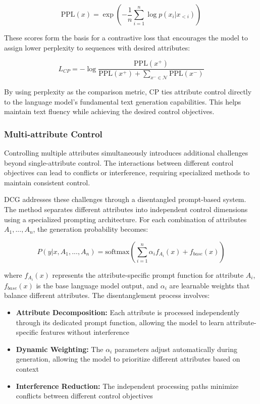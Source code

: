\begin{equation}
   \text{PPL}(x) = \exp\left(-\frac{1}{n}\sum_{i=1}^n \log p(x_i|x_{<i})\right)
\end{equation}

These scores form the basis for a contrastive loss that encourages the model to assign lower perplexity to sequences with desired attributes:

\begin{equation}
   L_{CP} = -\log\frac{\text{PPL}(x^+)}{\text{PPL}(x^+) + \sum_{x^- \in \mathcal{N}} \text{PPL}(x^-)}
\end{equation}

By using perplexity as the comparison metric, CP ties attribute control directly to the language model's fundamental text generation capabilities. This helps maintain text fluency while achieving the desired control objectives.

\subsubsection{Multi-attribute Control}

Controlling multiple attributes simultaneously introduces additional challenges beyond single-attribute control. The interactions between different control objectives can lead to conflicts or interference, requiring specialized methods to maintain consistent control.

DCG addresses these challenges through a disentangled prompt-based system. The method separates different attributes into independent control dimensions using a specialized prompting architecture. For each combination of attributes $A_1, ..., A_n$, the generation probability becomes:

\begin{equation}
    P(y|x, A_1, ..., A_n) = \text{softmax}(\sum_{i=1}^n \alpha_i f_{A_i}(x) + f_{base}(x))
\end{equation}

where $f_{A_i}(x)$ represents the attribute-specific prompt function for attribute $A_i$, $f_{base}(x)$ is the base language model output, and $\alpha_i$ are learnable weights that balance different attributes. The disentanglement process involves:

\begin{itemize}
    \item \textbf{Attribute Decomposition:} Each attribute is processed independently through its dedicated prompt function, allowing the model to learn attribute-specific features without interference
    
    \item \textbf{Dynamic Weighting:} The $\alpha_i$ parameters adjust automatically during generation, allowing the model to prioritize different attributes based on context
    
    \item \textbf{Interference Reduction:} The independent processing paths minimize conflicts between different control objectives
\end{itemize}

